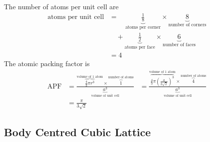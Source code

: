 \documentclass[titlepage, fleqn, a4paper, 12pt, twoside]{article}
\theoremstyle{definition}
\theoremstyle{theorem}
\begin{document}
The number of atoms per unit cell are
\begin{align*}
	\text{atoms per unit cell} &=\quad \underbrace{\frac{1}{8}}_{\text{atoms per corner}} \times \underbrace{8}_{\text{number of corners}}\\
	&\quad + \underbrace{\frac{1}{2}}_{\text{atoms per face}} \times \underbrace{6}_{\text{number of faces}}\\
	&= 4
\end{align*}
The atomic packing factor is
\begin{align*}
	\text{APF} &= \frac{\overbrace{\frac{4}{3} \pi r^3}^{\text{volume of 1 atom}} \times \overbrace{1}^{\text{number of atoms}}}{\underbrace{a^3}_{\text{volume of unit cell}}}
	&= \frac{\overbrace{\frac{4}{3} \pi \left( \frac{a}{2 \sqrt{2}} \right)^3}^{\text{volume of 1 atom}} \times \overbrace{4}^{\text{number of atoms}}}{\underbrace{a^3}_{\text{volume of unit cell}}}\\
	&= \frac{\pi}{3 \sqrt{2}}
\end{align*}

\subsection{Body Centred Cubic Lattice}
\end{document}
